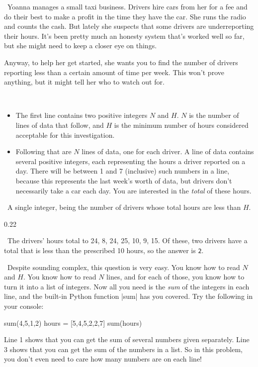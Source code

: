 

\Question\ Yoanna manages a small taxi business. Drivers hire cars from her for a fee and
do their best to make a profit in the time they have the car. She runs the radio and
counts the cash. But lately she suspects that some drivers are underreporting their hours.
It's been pretty much an honesty system that's worked well so far, but she might need to
keep a closer eye on things.

Anyway, to help her get started, she wants you to find the number of drivers reporting
less than a certain amount of time per week. This won't prove anything, but it might tell
her who to watch out for.

\Input\

\begin{itemize}
  \item The first line contains two positive integers $N$ and $H$. $N$ is the number of
    lines of data that follow, and $H$ is the minimum number of hours considered
    acceptable for this investigation.
  \item Following that are $N$ lines of data, one for each driver. A line of data contains
    several positive integers, each representing the hours a driver reported on a day.
    There will be between 1 and 7 (inclusive) such numbers in a line, because this
    represents the last week's worth of data, but drivers don't necessarily take a car
    each day. You are interested in the \emph{total} of these hours.
\end{itemize}

\Output\ A single integer, being the number of drivers whose total hours are less than
$H$.

\Sample

       {0.2}{2}

\Explanation\ The drivers' hours total to 24, 8, 24, 25, 10, 9, 15. Of these, two drivers
have a total that is less than the prescribed 10 hours, so the answer is \texttt{2}.

\Scratch\ Despite sounding complex, this question is very easy. You know how to read $N$
and $H$. You know how to read $N$ lines, and for each of those, you know how to turn it
into a list of integers. Now all you need is the \emph{sum} of the integers in each line,
and the built-in Python function \pycode|sum| has you covered. Try the following in your
console:

\begin{pythoncode}
  sum(4,5,1,2)
  hours = [5,4,5,2,2,7]
  sum(hours)
\end{pythoncode}

Line 1 shows that you can get the sum of several numbers given separately. Line 3 shows
that you can get the sum of the numbers in a list. So in this problem, you don't even need
to care how many numbers are on each line!
